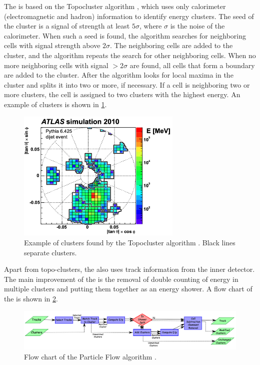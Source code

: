The \PFa is based on the Topocluster algorithm \cite{topocluster}, which uses only calorimeter (electromagnetic and hadron) information to identify energy clusters.
The seed of the cluster is a signal of strength at least $5\sigma$, where $\sigma$ is the noise of the calorimeter.
When such a seed is found, the algorithm searches for neighboring cells with signal strength above $2\sigma$.
The neighboring cells are added to the cluster, and the algorithm repeats the search for other neighboring cells.
When no more neighboring cells with signal $>2\sigma$ are found, all cells that form a boundary are added to the cluster.
After the algorithm looks for local maxima in the cluster and splits it into two or more, if necessary.
If a cell is neighboring two or more clusters, the cell is assigned to two clusters with the highest energy.
An example of clusters is shown in \cref{fig:topocluster}. 
\begin{figure}[ht]
    \centering
    \includegraphics[width=0.7\textwidth]{src/img/topocluster.png}
    \caption{Example of clusters found by the Topocluster algorithm \cite{topocluster}. Black lines separate clusters.}
    \label{fig:topocluster}
\end{figure}

Apart from topo-clusters, the \PFa also uses track information from the inner detector.
The main improvement of the \PFa is the removal of double counting of energy in multiple clusters and putting them together as an energy shower.
A flow chart of the \PFa is shown in \cref{fig:pfo}.
\begin{figure}[ht]
    \centering
    \includegraphics[width=1.\textwidth]{src/img/PF_algorithm.png}
    \caption{Flow chart of the Particle Flow algorithm \cite{PFO}.}
    \label{fig:pfo}
\end{figure}

